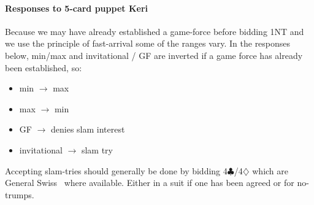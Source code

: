 \documentclass[a4paper,14pt]{extarticle}
\begin{document}
\paragraph{Responses to 5-card puppet Keri}

Because we may have already established a game-force before bidding 1NT and we
use the principle of fast-arrival some of the ranges vary. In the responses
below, min/max and invitational / GF are inverted if a game force has already
been established, so:

\begin{itemize}
\item min $\rightarrow$ max
\item max $\rightarrow$ min
\item GF $\rightarrow$ denies slam interest
\item invitational $\rightarrow$ slam try
\end{itemize}

Accepting slam-tries should generally be done by bidding
4$\clubsuit$/4$\diamondsuit$ which are General Swiss~ where
available. Either in a suit if one has been agreed or for no-trumps.
\end{document}
